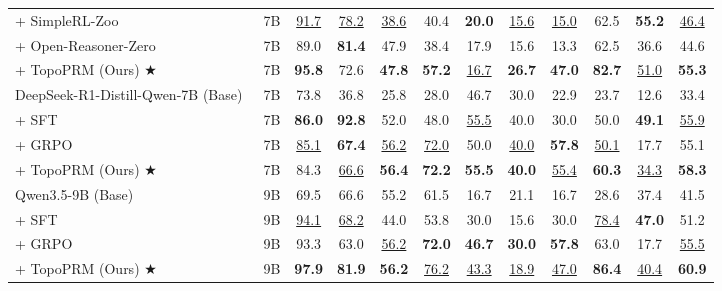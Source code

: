 \begin{table}[!htb]
{\begin{tabular}{@{}l c cc cc ccc cc c@{}}
\quad + SimpleRL-Zoo~\cite{zeng2503simplerlzoo} & 7B & \underline{91.7} & \underline{78.2} & \underline{38.6} & 40.4 & \textbf{20.0} & \underline{15.6} & \underline{15.0} & 62.5 & \textbf{55.2} & \underline{46.4} \\
\quad + Open-Reasoner-Zero~\cite{hu2026open}  & 7B & 89.0 & \textbf{81.4} & 47.9 & 38.4 & 17.9 & 15.6 & 13.3 & 62.5 & 36.6 & 44.6 \\
\rowcolor{blue!6}
\quad + TopoPRM (Ours) $\bigstar$ & 7B & \textbf{95.8} & 72.6 & \textbf{47.8} & \textbf{57.2} & \underline{16.7} & \textbf{26.7} & \textbf{47.0} & \textbf{82.7} & \underline{51.0} & \textbf{55.3} \\
\midrule
\rowcolor{gray!10}
DeepSeek-R1-Distill-Qwen-7B (Base)~\cite{deepseekr1} & 7B & 73.8 & 36.8 & 25.8 & 28.0 & 46.7 & 30.0 & 22.9 & 23.7 & 12.6 & 33.4 \\
\quad + SFT & 7B & \textbf{86.0} & \textbf{92.8} & 52.0 & 48.0 & \underline{55.5} & 40.0 & 30.0 & 50.0 & \textbf{49.1} & \underline{55.9} \\
\quad + GRPO~\cite{shao2024deepseekmath}     & 7B & \underline{85.1} & \textbf{67.4} & \underline{56.2} & \underline{72.0} & 50.0 & \underline{40.0} & \textbf{57.8} & \underline{50.1} & 17.7 & 55.1 \\
\rowcolor{blue!6}
\quad + TopoPRM (Ours) $\bigstar$ & 7B & 84.3 & \underline{66.6} & \textbf{56.4} & \textbf{72.2} & \textbf{55.5} & \textbf{40.0} & \underline{55.4} & \textbf{60.3} & \underline{34.3} & \textbf{58.3} \\
\midrule
\rowcolor{gray!10}
Qwen3.5-9B (Base)                            & 9B & 69.5 & 66.6 & 55.2 & 61.5 & 16.7 & 21.1 & 16.7 & 28.6 & 37.4 & 41.5 \\
\quad + SFT                                  & 9B & \underline{94.1} & \underline{68.2} & 44.0 & 53.8 & 30.0 & 15.6 & 30.0 & \underline{78.4} & \textbf{47.0} & 51.2 \\
\quad + GRPO~\cite{shao2024deepseekmath}     & 9B & 93.3 & 63.0 & \underline{56.2} & \textbf{72.0} & \textbf{46.7} & \textbf{30.0} & \textbf{57.8} & 63.0 & 17.7 & \underline{55.5} \\
\rowcolor{blue!6}
\quad + TopoPRM (Ours) $\bigstar$ & 9B & \textbf{97.9} & \textbf{81.9} & \textbf{56.2} & \underline{76.2} & \underline{43.3} & \underline{18.9} & \underline{47.0} & \textbf{86.4} & \underline{40.4} & \textbf{60.9} \\
\bottomrule
\end{tabular}%
}
\end{table}

